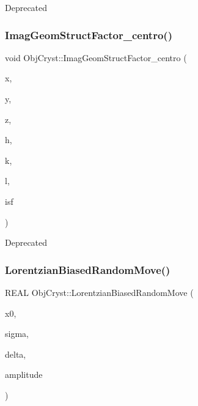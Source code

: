 \begin{DoxyRefDesc}{Deprecated}
\item[\mbox{\hyperlink{deprecated__deprecated000023}{Deprecated}}]\end{DoxyRefDesc}
\mbox{\label{namespace_obj_cryst_a44411e82576a5105e9ea4a1d14444d2d}} 
\subsubsection{\texorpdfstring{ImagGeomStructFactor\_centro()}{ImagGeomStructFactor\_centro()}}
{\footnotesize\ttfamily void Obj\+Cryst\+::\+Imag\+Geom\+Struct\+Factor\+\_\+centro (\begin{DoxyParamCaption}\item[{const R\+E\+AL}]{x,  }\item[{const R\+E\+AL}]{y,  }\item[{const R\+E\+AL}]{z,  }\item[{const Cryst\+Vector\+\_\+\+R\+E\+AL \&}]{h,  }\item[{const Cryst\+Vector\+\_\+\+R\+E\+AL \&}]{k,  }\item[{const Cryst\+Vector\+\_\+\+R\+E\+AL \&}]{l,  }\item[{Cryst\+Vector\+\_\+\+R\+E\+AL \&}]{isf }\end{DoxyParamCaption})}

\begin{DoxyRefDesc}{Deprecated}
\item[\mbox{\hyperlink{deprecated__deprecated000014}{Deprecated}}]\end{DoxyRefDesc}
\mbox{\label{namespace_obj_cryst_a8b6775b47b6ebf273d5737006ffd3209}} 
\subsubsection{\texorpdfstring{LorentzianBiasedRandomMove()}{LorentzianBiasedRandomMove()}}
{\footnotesize\ttfamily R\+E\+AL Obj\+Cryst\+::\+Lorentzian\+Biased\+Random\+Move (\begin{DoxyParamCaption}\item[{const R\+E\+AL}]{x0,  }\item[{const R\+E\+AL}]{sigma,  }\item[{const R\+E\+AL}]{delta,  }\item[{const R\+E\+AL}]{amplitude }\end{DoxyParamCaption})}

